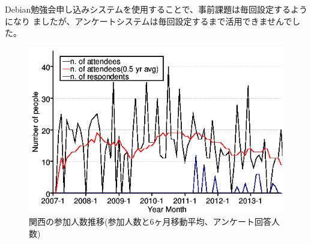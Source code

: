 \documentclass[mingoth,a4paper]{jsarticle}
\begin{document}
Debian勉強会申し込みシステムを使用することで、事前課題は毎回設定するようになり
ましたが、アンケートシステムは毎回設定するまで活用できませんでした。
%
\begin{figure}[h]
  \begin{center}
    \includegraphics[width=.6\hsize]{image201312/memberanalysis/kansai.png}
  \end{center}
  \caption{関西の参加人数推移(参加人数と6ヶ月移動平均、アンケート回答人数)}
  \label{fig:kansaipeoplechart}
\end{figure}

\end{document}
